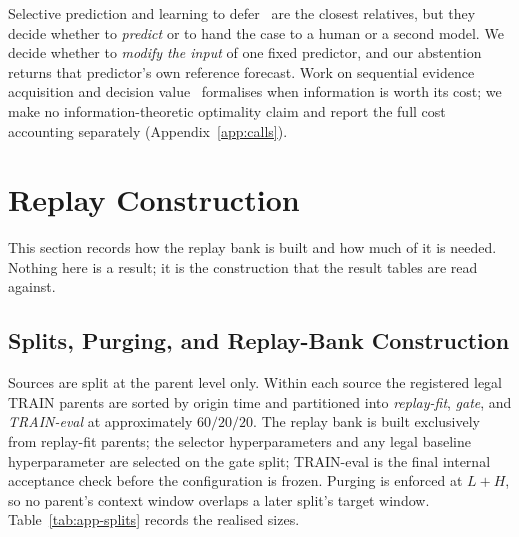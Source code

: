 \documentclass{article}
\begin{document}
Selective prediction and learning to defer~\citep{chow1970optimum,vovk2005algorithmic,
geifman2017selective,madras2018predict,mozannar2020consistent} are the closest relatives, but
they decide whether to \emph{predict} or to hand the case to a human or a second model. We
decide whether to \emph{modify the input} of one fixed predictor, and our abstention returns
that predictor's own reference forecast. Work on sequential evidence acquisition and decision
value~\citep{he2024dime,kang2020forecastwithforecasts} formalises when information is worth
its cost; we make no information-theoretic optimality claim and report the full cost
accounting separately (Appendix~\ref{app:calls}).

\section{Replay Construction}
\label{app:replay}
This section records how the replay bank is built and how much of it is needed. Nothing here
is a result; it is the construction that the result tables are read against.

\subsection{Splits, Purging, and Replay-Bank Construction}
\label{app:splits}
Sources are split at the parent level only. Within each source the registered legal TRAIN
parents are sorted by origin time and partitioned into \emph{replay-fit}, \emph{gate}, and
\emph{TRAIN-eval} at approximately $60/20/20$. The replay bank is built exclusively from
replay-fit parents; the selector hyperparameters and any legal baseline hyperparameter are selected on the
gate split; TRAIN-eval is the final internal acceptance check before the configuration is
frozen. Purging is enforced at $L + H$, so no parent's context window overlaps a later
split's target window. Table~\ref{tab:app-splits} records the realised sizes.
\end{document}
